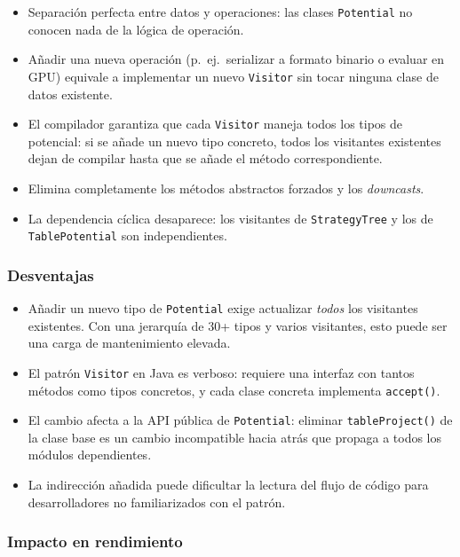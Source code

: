 \documentclass[11pt,a4paper]{article}
\newcommand{\code}[1]{\texttt{#1}}
\begin{document}
\begin{itemize}
  \item Separación perfecta entre datos y operaciones: las clases \code{Potential}
        no conocen nada de la lógica de operación.
  \item Añadir una nueva operación (p.~ej.\ serializar a formato binario o
        evaluar en GPU) equivale a implementar un nuevo \code{Visitor} sin tocar
        ninguna clase de datos existente.
  \item El compilador garantiza que cada \code{Visitor} maneja todos los tipos de
        potencial: si se añade un nuevo tipo concreto, todos los visitantes
        existentes dejan de compilar hasta que se añade el método correspondiente.
  \item Elimina completamente los métodos abstractos forzados y los
        \emph{downcasts}.
  \item La dependencia cíclica desaparece: los visitantes de \code{StrategyTree}
        y los de \code{TablePotential} son independientes.
\end{itemize}

\subsubsection*{Desventajas}

\begin{itemize}
  \item Añadir un nuevo tipo de \code{Potential} exige actualizar \emph{todos}
        los visitantes existentes.  Con una jerarquía de 30+ tipos y varios
        visitantes, esto puede ser una carga de mantenimiento elevada.
  \item El patrón \code{Visitor} en Java es verboso: requiere una interfaz con
        tantos métodos como tipos concretos, y cada clase concreta implementa
        \code{accept()}.
  \item El cambio afecta a la API pública de \code{Potential}: eliminar
        \code{tableProject()} de la clase base es un cambio incompatible hacia
        atrás que propaga a todos los módulos dependientes.
  \item La indirección añadida puede dificultar la lectura del flujo de código
        para desarrolladores no familiarizados con el patrón.
\end{itemize}

\subsubsection*{Impacto en rendimiento}
\end{document}
